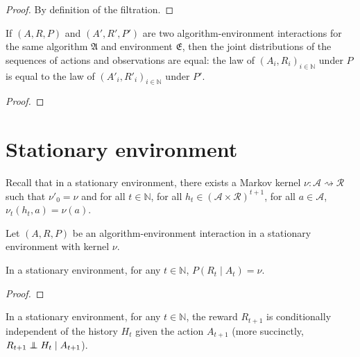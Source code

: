 \begin{proof}\leanok
By definition of the filtration.
\end{proof}


\begin{theorem}\label{thm:isAlgEnvSeq_unique}
  \leanok
If $(A, R, P)$ and $(A', R', P')$ are two algorithm-environment interactions for the same algorithm $\mathfrak{A}$ and environment $\mathfrak{E}$, then the joint distributions of the sequences of actions and observations are equal: the law of $(A_i, R_i)_{i \in \mathbb{N}}$ under $P$ is equal to the law of $(A'_i, R'_i)_{i \in \mathbb{N}}$ under $P'$.
\end{theorem}

\begin{proof}\leanok

\end{proof}



\section{Stationary environment}

Recall that in a stationary environment, there exists a Markov kernel $\nu : \mathcal{A} \rightsquigarrow \mathcal{R}$ such that $\nu'_0 = \nu$ and for all $t \in \mathbb{N}$, for all $h_t \in (\mathcal{A} \times \mathcal{R})^{t+1}$, for all $a \in \mathcal{A}$, $\nu_t(h_t, a) = \nu(a)$.

Let $(A, R, P)$ be an algorithm-environment interaction in a stationary environment with kernel $\nu$.

\begin{lemma}\label{lem:condDistrib_reward_stationaryEnv}
  \leanok
In a stationary environment, for any $t \in \mathbb{N}$, $P\left(R_t \mid A_t\right) = \nu$.
\end{lemma}

\begin{proof}\leanok

\end{proof}


\begin{lemma}\label{lem:condIndepFun_reward_hist_action}
  \leanok
In a stationary environment, for any $t \in \mathbb{N}$, the reward $R_{t+1}$ is conditionally independent of the history $H_t$ given the action $A_{t+1}$ (more succinctly, $R_{t+1} \perp\!\!\!\!\perp H_t \mid A_{t+1}$).
\end{lemma}

